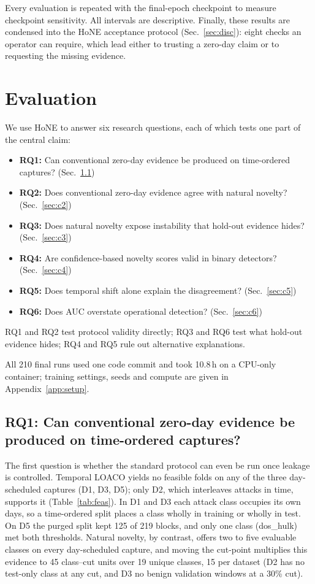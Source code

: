\documentclass[conference]{IEEEtran}
\begin{document}
 Every evaluation is repeated with the final-epoch checkpoint to measure checkpoint sensitivity. All intervals are descriptive. Finally, these results are condensed into the HoNE acceptance protocol (Sec.~\ref{sec:disc}): eight checks an operator can require, which lead either to trusting a zero-day claim or to requesting the missing evidence.

\section{Evaluation}
\label{sec:eval}
We use HoNE to answer six research questions, each of which tests one part of the central claim:
\begin{itemize}
\item \textbf{RQ1:} Can conventional zero-day evidence be produced on time-ordered captures? (Sec.~\ref{sec:c1})
\item \textbf{RQ2:} Does conventional zero-day evidence agree with natural novelty? (Sec.~\ref{sec:c2})
\item \textbf{RQ3:} Does natural novelty expose instability that hold-out evidence hides? (Sec.~\ref{sec:c3})
\item \textbf{RQ4:} Are confidence-based novelty scores valid in binary detectors? (Sec.~\ref{sec:c4})
\item \textbf{RQ5:} Does temporal shift alone explain the disagreement? (Sec.~\ref{sec:c5})
\item \textbf{RQ6:} Does AUC overstate operational detection? (Sec.~\ref{sec:c6})
\end{itemize}
RQ1 and RQ2 test protocol validity directly; RQ3 and RQ6 test what hold-out evidence hides; RQ4 and RQ5 rule out alternative explanations.

All 210 final runs used one code commit and took 10.8\,h on a CPU-only container; training settings, seeds and compute are given in Appendix~\ref{app:setup}.

\subsection{RQ1: Can conventional zero-day evidence be produced on time-ordered captures?}
\label{sec:c1}
The first question is whether the standard protocol can even be run once leakage is controlled. Temporal LOACO yields no feasible folds on any of the three day-scheduled captures (D1, D3, D5); only D2, which interleaves attacks in time, supports it (Table~\ref{tab:feas}). In D1 and D3 each attack class occupies its own days, so a time-ordered split places a class wholly in training or wholly in test. On D5 the purged split kept 125 of 219 blocks, and only one class (dos\_hulk) met both thresholds. Natural novelty, by contrast, offers two to five evaluable classes on every day-scheduled capture, and moving the cut-point multiplies this evidence to 45 class--cut units over 19 unique classes, 15 per dataset (D2 has no test-only class at any cut, and D3 no benign validation windows at a 30\% cut).
\end{document}
